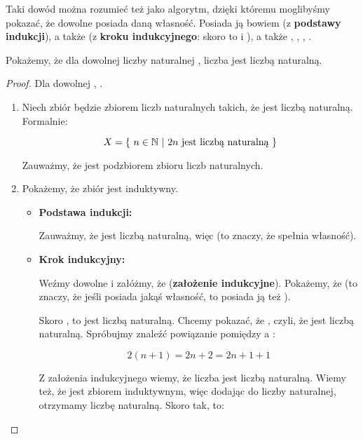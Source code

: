 Taki dowód można rozumieć też jako algorytm, dzięki któremu moglibyśmy pokazać, że dowolne  posiada daną własność. Posiada ją bowiem  (z \textbf{podstawy indukcji}), a także  (z \textbf{kroku indukcyjnego}: skoro  to i ), a także , , \m{\ldots}, . 

\begin{example}
Pokażemy, że dla dowolnej liczby naturalnej , liczba  jest liczbą naturalną. 

\begin{proof} Dla dowolnej , .
\begin{enumerate}
    \item Niech zbiór  będzie zbiorem liczb naturalnych  takich, że  jest liczbą naturalną. Formalnie:
    
        \[ 
            X = \{\ n \in \mathbb{N}\ |\ 2n \text{ jest liczbą naturalną}\ \} 
        \]
    
    Zauważmy, że  jest podzbiorem zbioru liczb naturalnych.
    
    \item Pokażemy, że zbiór  jest induktywny. 
        
        \begin{itemize}
            \item \textbf{Podstawa indukcji:}
            
                Zauważmy, że  jest liczbą naturalną, więc  (to znaczy, że  spełnia własność).
            
            \item \textbf{Krok indukcyjny:}
            
                Weźmy dowolne  i załóżmy, że  (\textbf{założenie indukcyjne}). Pokażemy, że  (to znaczy, że jeśli  posiada jakąś własność, to posiada ją też ).
                
                Skoro , to  jest liczbą naturalną. Chcemy pokazać, że , czyli, że  jest liczbą naturalną. Spróbujmy znaleźć powiązanie pomiędzy  a :
                
                \[
                    2(n+1) = 2n + 2 = 2n + 1 + 1
                \]
                
                Z założenia indukcyjnego wiemy, że liczba  jest liczbą naturalną. Wiemy też, że  jest zbiorem induktywnym, więc dodając  do liczby naturalnej, otrzymamy liczbę naturalną. Skoro tak, to:
                

\end{itemize}
\end{enumerate}
\end{proof}
\end{example}

